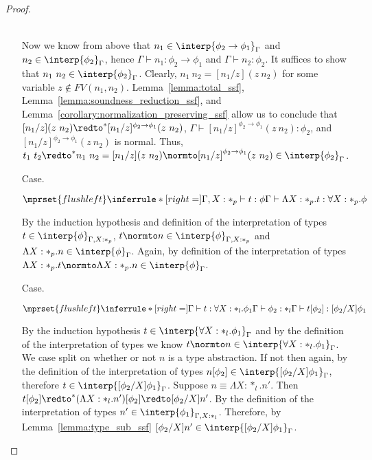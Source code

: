 \begin{proof}
\begin{itemize}
  \ \\
  Now we know from above that $n_1 \in \interp{\phi_2 \rightarrow \phi_1}_\Gamma$ and
  $n_2 \in \interp{\phi_2}_\Gamma$, hence $\Gamma \vdash n_1:\phi_2 \to \phi_1$ and
  $\Gamma \vdash n_2:\phi_2$.  It suffices to show that $n_1\ n_2 \in \interp{\phi_2}_\Gamma$.
  Clearly, $n_1\ n_2 = [n_1/z](z\ n_2)$ for some variable $z \not \in FV(n_1,n_2)$.  
  Lemma~\ref{lemma:total_ssf}, Lemma~\ref{lemma:soundness_reduction_ssf}, 
  and Lemma~\ref{corollary:normalization_preserving_ssf} allow us to conclude that 
  $[n_1/z](z\ n_2) \redto^* [n_1/z]^{\phi_2 \to \phi_1}(z\ n_2)$, $\Gamma \vdash [n_1/z]^{\phi_2 \to \phi_1}(z\ n_2):\phi_2$,
  and $[n_1/z]^{\phi_2 \to \phi_1}(z\ n_2)$ is normal.  Thus, 
  $t_1\ t_2 \redto^* n_1\ n_2 = [n_1/z](z\ n_2) \normto [n_1/z]^{\phi_2 \to \phi_1}(z\ n_2) \in \interp{\phi_2}_\Gamma$.
  
\item[Case.]\ \\
  \begin{center}
    \begin{math}
      $$\mprset{flushleft}
      \inferrule* [right=] {
        \Gamma, X : *_p \vdash t : \phi
      }{\Gamma \vdash \Lambda X:*_p.t:\forall X:*_p.\phi}
    \end{math}
  \end{center}
  By the induction hypothesis and definition of the interpretation of types 
  $t \in \interp{\phi}_{\Gamma,X:*_p}$, $t \normto n \in \interp{\phi}_{\Gamma,X:*_p}$ and 
  $\Lambda X:*_p.n \in \interp{\phi}_{\Gamma}$.  Again, by definition of the interpretation 
  of types $\Lambda X:*_p.t \normto \Lambda X:*_p.n \in \interp{\phi}_{\Gamma}$.

\item[Case.]\ \\
  \begin{center}
    \begin{math}
      $$\mprset{flushleft}
      \inferrule* [right=] {
        \Gamma \vdash t:\forall X:*_l.\phi_1
        \\
        \Gamma \vdash \phi_2:*_l
      }{\Gamma \vdash t[\phi_2]: [\phi_2/X]\phi_1}
    \end{math}
  \end{center}
  By the induction hypothesis $t \in \interp{\forall X:*_l.\phi_1}_\Gamma$ and by the 
  definition of the interpretation of types we know 
  $t \normto n \in \interp{\forall X:*_l.\phi_1}_\Gamma$.  We case
  split on whether or not $n$ is a type abstraction. If not then again, by the 
  definition of the interpretation of types 
  $n[\phi_2] \in \interp{[\phi_2/X]\phi_1}_\Gamma$, therefore 
  $t \in \interp{[\phi_2/X]\phi_1}_\Gamma$.  Suppose $n \equiv \Lambda X:*_l.n'$.  Then 
  $t[\phi_2] \redto^* (\Lambda X:*_l.n')[\phi_2] \redto [\phi_2/X]n'$.  By the definition 
  of the interpretation of types $n' \in \interp{\phi_1}_{\Gamma,X:*_l}$. Therefore, by
  Lemma~\ref{lemma:type_sub_ssf} $[\phi_2/X]n' \in \interp{[\phi_2/X]\phi_1}_{\Gamma}$.
\end{itemize}
\end{proof}
